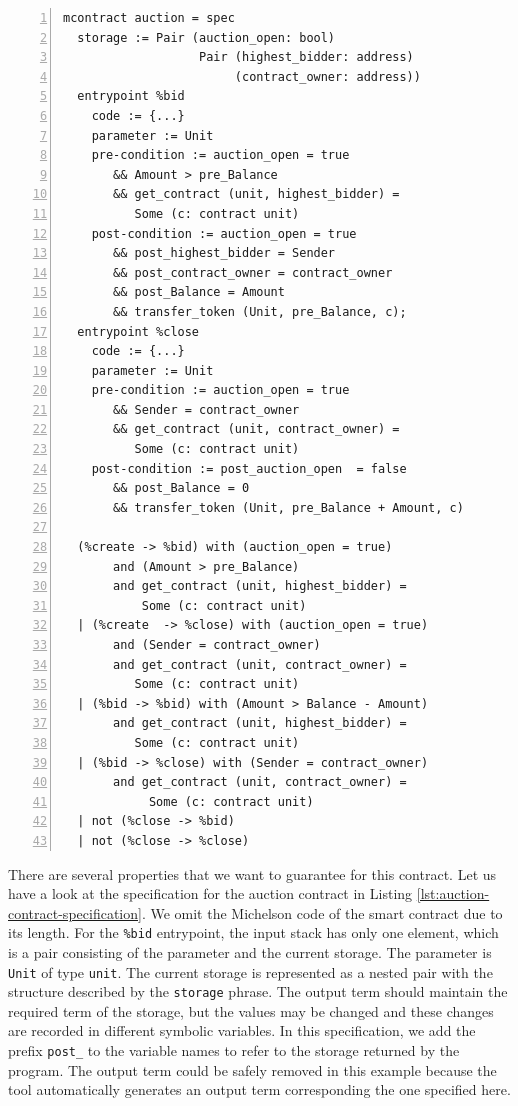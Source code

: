 \documentclass[a4paper,USenglish,cleveref, autoref,anonymous]{lipics-v2021}
\begin{document}
\begin{lstlisting}[float=tp,captionpos=b,caption={Auction contract specification},label={lst:auction-contract-specification},numbers=left]
mcontract auction = spec 
  storage := Pair (auction_open: bool) 
                   Pair (highest_bidder: address)
                        (contract_owner: address))
  entrypoint %bid
    code := {...}
    parameter := Unit 
    pre-condition := auction_open = true
       && Amount > pre_Balance
       && get_contract (unit, highest_bidder) = 
          Some (c: contract unit)
    post-condition := auction_open = true
       && post_highest_bidder = Sender 
       && post_contract_owner = contract_owner 
       && post_Balance = Amount 
       && transfer_token (Unit, pre_Balance, c);
  entrypoint %close
    code := {...}
    parameter := Unit
    pre-condition := auction_open = true
       && Sender = contract_owner  
       && get_contract (unit, contract_owner) = 
          Some (c: contract unit)              
    post-condition := post_auction_open  = false
       && post_Balance = 0 
       && transfer_token (Unit, pre_Balance + Amount, c) 

  (%create -> %bid) with (auction_open = true)  
       and (Amount > pre_Balance) 
       and get_contract (unit, highest_bidder) = 
           Some (c: contract unit)
  | (%create  -> %close) with (auction_open = true) 
       and (Sender = contract_owner)
       and get_contract (unit, contract_owner) = 
          Some (c: contract unit)
  | (%bid -> %bid) with (Amount > Balance - Amount) 
       and get_contract (unit, highest_bidder) = 
          Some (c: contract unit)
  | (%bid -> %close) with (Sender = contract_owner) 
       and get_contract (unit, contract_owner) = 
            Some (c: contract unit)
  | not (%close -> %bid)
  | not (%close -> %close)
\end{lstlisting}

There are several properties that we want to guarantee for this
contract. Let us have a look at the specification for the auction
contract in Listing \ref{lst:auction-contract-specification}. We omit
the Michelson code of the smart contract due to its length.  For the
\lstinline/%bid/ entrypoint, the input stack has only one element,
which is a pair consisting of the parameter and the current
storage. The parameter is \lstinline/Unit/ of type \lstinline/unit/.
The current storage is represented as a nested pair with the
structure described by the \lstinline|storage| phrase. 
The output term should maintain the required term of the storage,
but the values may be changed and these changes are recorded in
different symbolic variables. In this specification, we add the prefix
\lstinline/post_/ to the variable names to refer to the storage
returned by the program. The output term could be safely removed in
this example because the tool automatically generates an output
term corresponding the one specified here.
\end{document}
